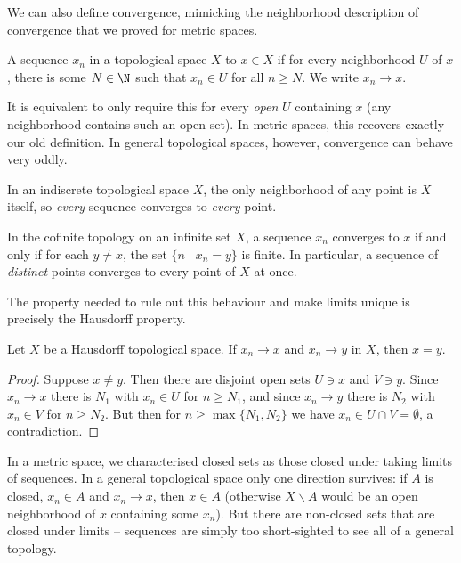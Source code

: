 We can also define convergence, mimicking the neighborhood description of convergence that we proved for metric spaces.

\begin{definition}[Convergence]
    A sequence $x_n$ in a topological space $X$  to $x \in X$ if for every neighborhood $U$ of $x$, there is some $N \in \N$ such that $x_n \in U$ for all $n \geq N$. We write $x_n \rightarrow x$.
\end{definition}

It is equivalent to only require this for every \emph{open} $U$ containing $x$ (any neighborhood contains such an open set). In metric spaces, this recovers exactly our old definition. In general topological spaces, however, convergence can behave very oddly.

\begin{example}
    In an indiscrete topological space $X$, the only neighborhood of any point is $X$ itself, so \emph{every} sequence converges to \emph{every} point.

    In the cofinite topology on an infinite set $X$, a sequence $x_n$ converges to $x$ if and only if for each $y \neq x$, the set $\{n \mid x_n = y\}$ is finite. In particular, a sequence of \emph{distinct} points converges to every point of $X$ at once.
\end{example}

The property needed to rule out this behaviour and make limits unique is precisely the Hausdorff property.

\begin{proposition}
    Let $X$ be a Hausdorff topological space. If $x_n \rightarrow x$ and $x_n \rightarrow y$ in $X$, then $x = y$.
\end{proposition}
\begin{proof}
    Suppose $x \neq y$. Then there are disjoint open sets $U \ni x$ and $V \ni y$. Since $x_n \rightarrow x$ there is $N_1$ with $x_n \in U$ for $n \geq N_1$, and since $x_n \rightarrow y$ there is $N_2$ with $x_n \in V$ for $n \geq N_2$. But then for $n \geq \max\{N_1, N_2\}$ we have $x_n \in U \cap V = \emptyset$, a contradiction.
\end{proof}

\begin{remark}
    In a metric space, we characterised closed sets as those closed under taking limits of sequences. In a general topological space only one direction survives: if $A$ is closed, $x_n \in A$ and $x_n \rightarrow x$, then $x \in A$ (otherwise $X \backslash A$ would be an open neighborhood of $x$ containing some $x_n$). But there are non-closed sets that are closed under limits -- sequences are simply too short-sighted to see all of a general topology.
\end{remark}

